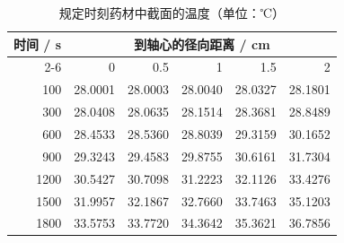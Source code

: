\begin{table}[htbp]
  \centering
  \caption{规定时刻药材中截面的温度（单位：℃）}
  \label{tab:q1-temperature}
  \small
  \begin{tabular}{rrrrrr}
    \toprule
    时间 / s & \multicolumn{5}{c}{到轴心的径向距离 / cm} \\
    \cmidrule(lr){2-6}
    & 0 & 0.5 & 1 & 1.5 & 2 \\
    \midrule
    100 & 28.0001 & 28.0003 & 28.0040 & 28.0327 & 28.1801 \\
    300 & 28.0408 & 28.0635 & 28.1514 & 28.3681 & 28.8489 \\
    600 & 28.4533 & 28.5360 & 28.8039 & 29.3159 & 30.1652 \\
    900 & 29.3243 & 29.4583 & 29.8755 & 30.6161 & 31.7304 \\
    1200 & 30.5427 & 30.7098 & 31.2223 & 32.1126 & 33.4276 \\
    1500 & 31.9957 & 32.1867 & 32.7660 & 33.7463 & 35.1203 \\
    1800 & 33.5753 & 33.7720 & 34.3642 & 35.3621 & 36.7856 \\
    \bottomrule
  \end{tabular}
\end{table}
